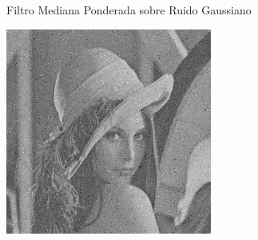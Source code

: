 \documentclass{beamer}
\begin{document}
\begin{frame}[fragile]{Filtro Mediana Ponderada sobre Ruido Gaussiano}
\begin{minipage}{0.25\linewidth}
	\end{minipage}\hfill
	\begin{minipage}{0.25\linewidth}
		\centering
		\includegraphics[width=\linewidth]{../results/lena_gauss_sigma50}
	\end{minipage}
	

\end{frame}
\end{document}
